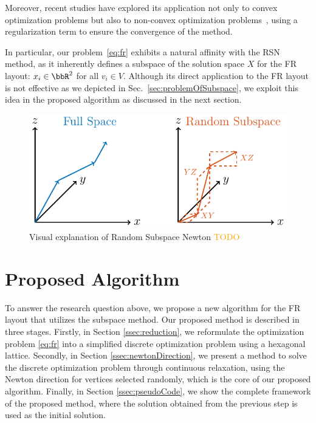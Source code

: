 \documentclass[dvipdfmx,lettersize,journal]{IEEEtran}
\newcommand{\orange}[1]{\textcolor{orange}{#1}}
\begin{document}
Moreover, recent studies have explored its application not only to convex optimization problems but also to non-convex optimization problems~\cite{fujiRandomizedSubspaceRegularized2022}, using a regularization term to ensure the convergence of the method.

In particular, our problem~\eqref{eq:fr} exhibits a natural affinity with the RSN method, as it inherently defines a subspace of the solution space $X$ for the FR layout: $x_i \in \bbR^2$ for all $v_i \in V$.
Although its direct application to the FR layout is not effective as we depicted in Sec.~\ref{sec:problemOfSubspace}, we exploit this idea in the proposed algorithm as discussed in the next section.

\begin{figure}[t]
  \centering
  \includegraphics[width=\columnwidth]{randomSubspace/randomSubspace.pdf}
  \caption{
    Visual explanation of Random Subspace Newton
    \orange{TODO}
  }
  \label{fig:randomSubspace}
\end{figure}

\section{Proposed Algorithm}\label{sec:algorithm}

To answer the research question above, we propose a new algorithm for the FR layout that utilizes the subspace method.
Our proposed method is described in three stages.
Firstly, in Section \ref{ssec:reduction}, we reformulate the optimization problem \eqref{eq:fr} into a simplified discrete optimization problem using a hexagonal lattice.
Secondly, in Section \ref{ssec:newtonDirection}, we present a method to solve the discrete optimization problem through continuous relaxation, using the Newton direction for vertices selected randomly, which is the core of our proposed algorithm.
Finally, in Section \ref{ssec:pseudoCode}, we show the complete framework of the proposed method, where the solution obtained from the previous step is used as the initial solution.
\end{document}
